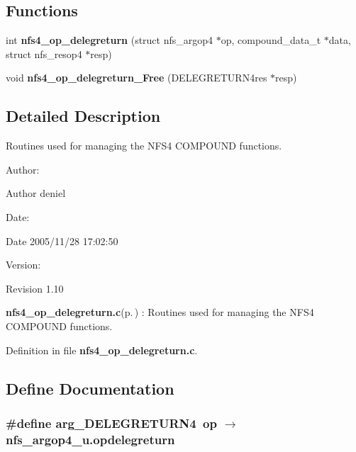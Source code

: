 \subsection*{Functions}
\begin{CompactItemize}
\item 
int {\bf nfs4\_\-op\_\-delegreturn} (struct nfs\_\-argop4 $\ast$op, compound\_\-data\_\-t $\ast$data, struct nfs\_\-resop4 $\ast$resp)
\item 
void {\bf nfs4\_\-op\_\-delegreturn\_\-Free} (DELEGRETURN4res $\ast$resp)
\end{CompactItemize}


\subsection{Detailed Description}
Routines used for managing the NFS4 COMPOUND functions. 

\begin{Desc}
\item[Author:]\begin{Desc}
\item[Author]deniel \end{Desc}
\end{Desc}
\begin{Desc}
\item[Date:]\begin{Desc}
\item[Date]2005/11/28 17:02:50 \end{Desc}
\end{Desc}
\begin{Desc}
\item[Version:]\begin{Desc}
\item[Revision]1.10 \end{Desc}
\end{Desc}
{\bf nfs4\_\-op\_\-delegreturn.c}{\rm (p.\,\pageref{nfs4__op__delegreturn_8c})} : Routines used for managing the NFS4 COMPOUND functions.

Definition in file {\bf nfs4\_\-op\_\-delegreturn.c}.

\subsection{Define Documentation}
\subsubsection{\setlength{\rightskip}{0pt plus 5cm}\#define arg\_\-DELEGRETURN4\ op $\rightarrow$ nfs\_\-argop4\_\-u.opdelegreturn}\label{nfs4__op__delegreturn_8c_a0}


